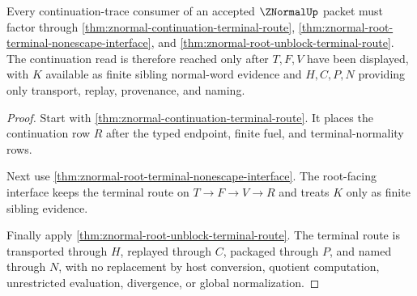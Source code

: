\begin{theorem}
\label{thm:znormal-root-continuation-trace-readiness}
Every continuation-trace consumer of an accepted $\ZNormalUp$ packet must factor through \autoref{thm:znormal-continuation-terminal-route}, \autoref{thm:znormal-root-terminal-nonescape-interface}, and \autoref{thm:znormal-root-unblock-terminal-route}. The continuation read is therefore reached only after $T,F,V$ have been displayed, with $K$ available as finite sibling normal-word evidence and $H,C,P,N$ providing only transport, replay, provenance, and naming.
\end{theorem}
\begin{proof}
Start with \autoref{thm:znormal-continuation-terminal-route}. It places the continuation row $R$ after the typed endpoint, finite fuel, and terminal-normality rows.

Next use \autoref{thm:znormal-root-terminal-nonescape-interface}. The root-facing interface keeps the terminal route on $T \to F \to V \to R$ and treats $K$ only as finite sibling evidence.

Finally apply \autoref{thm:znormal-root-unblock-terminal-route}. The terminal route is transported through $H$, replayed through $C$, packaged through $P$, and named through $N$, with no replacement by host conversion, quotient computation, unrestricted evaluation, divergence, or global normalization.
\end{proof}

